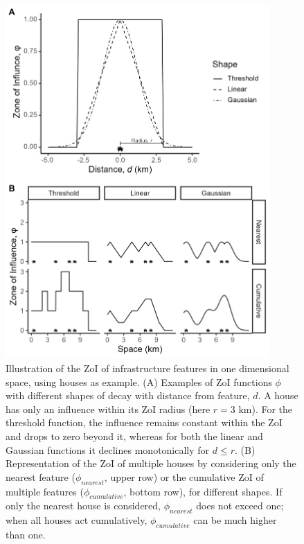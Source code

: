 \documentclass[titlepage]{article}
\begin{document}
\begin{figure}[!htbp]
\centering
\includegraphics[width=0.9\textwidth]{figures/ZoI_conceptual_new.png}
\caption{\label{fig:zoi_conceptual} Illustration of the ZoI of infrastructure features in one dimensional space, using houses as example. (A) Examples of ZoI functions $\phi$ with different shapes of decay with distance from feature, $d$. A house has only an influence within its ZoI radius (here $r = 3 \text{ km}$). For the threshold function, the influence remains constant within the ZoI and drops to zero beyond it, whereas for both the linear and Gaussian functions it declines monotonically for $d \leq r$. 
(B) Representation of the ZoI of multiple houses by considering only the nearest feature ($\phi_{nearest}$, upper row) or the cumulative ZoI of multiple features ($\phi_{cumulative}$, bottom row), for different shapes. If only the nearest house is considered, $\phi_{nearest}$ does not exceed one; when all houses act cumulatively, $\phi_{cumulative}$ can be much higher than one.}
\end{figure}
\end{document}
